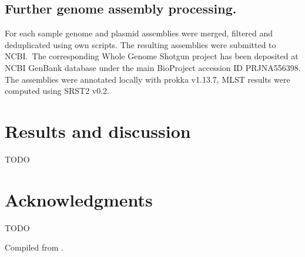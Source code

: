 \documentclass[12pt,a4paper]{article}
\begin{document}
\subsection{Further genome assembly processing.}\label{subsec:proc_ass}
For each sample genome and plasmid assemblies were merged, filtered and deduplicated using own scripts.
The resulting assemblies were submitted to NCBI.\
The corresponding Whole Genome Shotgun project has been deposited at NCBI GenBank database under the main
BioProject accession ID PRJNA556398.
The assemblies were annotated locally with prokka v1.13.7,   %
MLST results were computed using SRST2 v0.2.  %

\section{Results and discussion}\label{sec:res_dis}
TODO
\section{Acknowledgments}\label{sec:acks}
TODO

\printbibliography
Compiled from \LaTeXe{}.
\end{document}
